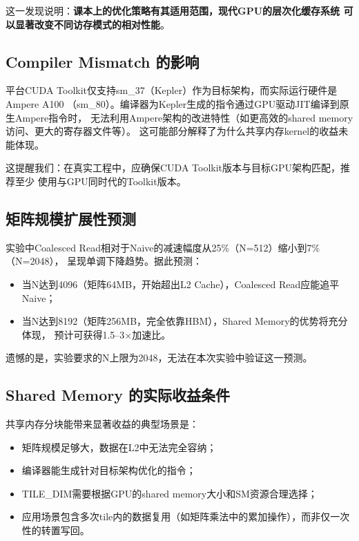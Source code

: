 \documentclass[UTF8,a4paper,12pt,fontset=none]{ctexart}
\begin{document}
这一发现说明：\textbf{课本上的优化策略有其适用范围，现代GPU的层次化缓存系统
可以显著改变不同访存模式的相对性能}。

\subsection{Compiler Mismatch 的影响}

平台CUDA Toolkit仅支持sm\_37（Kepler）作为目标架构，而实际运行硬件是Ampere A100
（sm\_80）。编译器为Kepler生成的指令通过GPU驱动JIT编译到原生Ampere指令时，
无法利用Ampere架构的改进特性（如更高效的shared memory访问、更大的寄存器文件等）。
这可能部分解释了为什么共享内存kernel的收益未能体现。

这提醒我们：在真实工程中，应确保CUDA Toolkit版本与目标GPU架构匹配，推荐至少
使用与GPU同时代的Toolkit版本。

\subsection{矩阵规模扩展性预测}

实验中Coalesced Read相对于Naive的减速幅度从25\%（N=512）缩小到7\%（N=2048），
呈现单调下降趋势。据此预测：
\begin{itemize}
  \item 当N达到4096（矩阵64MB，开始超出L2 Cache），Coalesced Read应能追平Naive；
  \item 当N达到8192（矩阵256MB，完全依靠HBM），Shared Memory的优势将充分体现，
        预计可获得1.5--3×加速比。
\end{itemize}

遗憾的是，实验要求的N上限为2048，无法在本次实验中验证这一预测。

\subsection{Shared Memory 的实际收益条件}

共享内存分块能带来显著收益的典型场景是：
\begin{itemize}
  \item 矩阵规模足够大，数据在L2中无法完全容纳；
  \item 编译器能生成针对目标架构优化的指令；
  \item TILE\_DIM需要根据GPU的shared memory大小和SM资源合理选择；
  \item 应用场景包含多次tile内的数据复用（如矩阵乘法中的累加操作），而非仅一次
        性的转置写回。
\end{itemize}
\end{document}
